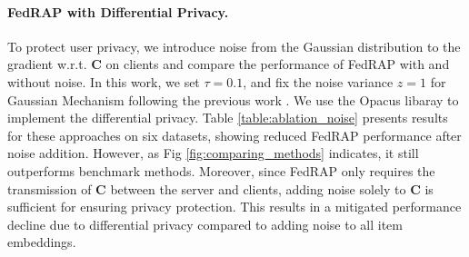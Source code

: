 \documentclass{article} %
\begin{document}
\paragraph{FedRAP with Differential Privacy.}
To protect user privacy, we introduce noise from the Gaussian distribution to the gradient w.r.t. $\mathbf{C}$ on clients and compare the performance of FedRAP with and without noise. 
In this work, we set $\tau=0.1$, and fix the noise variance $z=1$ for Gaussian Mechanism following the previous work \citep{mcmahan2018general}.
We use the Opacus libaray \citep{yousefpour2021opacus} to implement the differential privacy.
Table \ref{table:ablation_noise} presents results for these approaches on six datasets, showing reduced FedRAP performance after noise addition. However, as Fig \ref{fig:comparing_methods} indicates, it still outperforms benchmark methods. 
Moreover, since FedRAP only requires the transmission of $\mathbf{C}$ between the server and clients, adding noise solely to $\mathbf{C}$ is sufficient for ensuring privacy protection. This results in a mitigated performance decline due to differential privacy compared to adding noise to all item embeddings.

\begin{table}[!htbp]
\centering
    \caption{
        FedRAP vs. FedRAP-noise (FedRAP with injected noise for \textbf{differential privacy}) 
    }
    \label{table:ablation_noise}
\end{table}
\end{document}

